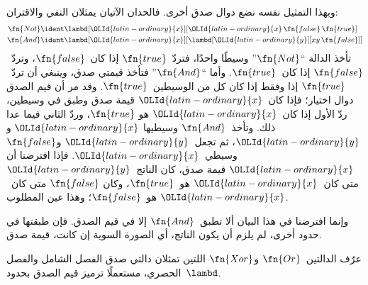 \documentclass[../../../include/open-logic-section]{subfiles}
\begin{document}
وبهذا التمثيل نفسه نضع دوال صدق أخرى. فالحدان الآتيان يمثلان النفي
والاقتران:
\begin{align*}
  \fn{Not} & \ident \lambd[{\OLId{latin-ordinary}{x}}][{\OLId{latin-ordinary}{x}}\, \fn{false}\, \fn{true}]\\
  \fn{And} & \ident \lambd[{\OLId{latin-ordinary}{x}}][\lambd[{\OLId{latin-ordinary}{y}}][xy \,\fn{false}]]
\end{align*}
تأخذ الدالة ``$\fn{Not}$'' وسيطًا واحدًا، فتردّ~$\fn{true}$ إذا
كان~$\fn{false}$، وتردّ~$\fn{false}$ إذا كان~$\fn{true}$. وأما
``$\fn{And}$'' فتأخذ قيمتي صدق، وينبغي أن تردّ~$\fn{true}$ إذا وفقط
إذا كان كل من الوسيطين~$\fn{true}$. وقد مر أن قيم الصدق دوال اختيار؛
فإذا كان~${\OLId{latin-ordinary}{x}}$ قيمة صدق وطبق في وسيطين، ردّ الأول إذا كان~${\OLId{latin-ordinary}{x}}$ هو
$\fn{true}$، وردّ الثاني فيما عدا ذلك. وتأخذ~$\fn{And}$ وسيطيها
${\OLId{latin-ordinary}{x}}$ و${\OLId{latin-ordinary}{y}}$، ثم تجعل~${\OLId{latin-ordinary}{y}}$ و$\fn{false}$ وسيطي~${\OLId{latin-ordinary}{x}}$. فإذا افترضنا أن
${\OLId{latin-ordinary}{x}}$ قيمة صدق، كان الناتج~${\OLId{latin-ordinary}{y}}$ متى كان~${\OLId{latin-ordinary}{x}}$ هو~$\fn{true}$، وكان
$\fn{false}$ متى كان~${\OLId{latin-ordinary}{x}}$ هو~$\fn{false}$؛ وهذا عين المطلوب.

وإنما افترضنا في هذا البيان ألا تطبق~$\fn{And}$ إلا في قيم الصدق.
فإن طبقتها في حدود أخرى، لم يلزم أن يكون الناتج، أي الصورة السوية إن
كانت، قيمة صدق.

\begin{prob}
  عرّف الدالتين~$\fn{Or}$ و$\fn{Xor}$ اللتين تمثلان دالتي صدق الفصل
  الشامل والفصل الحصري، مستعملًا ترميز قيم الصدق بحدود~$\lambd$.
\end{prob}
\end{document}
